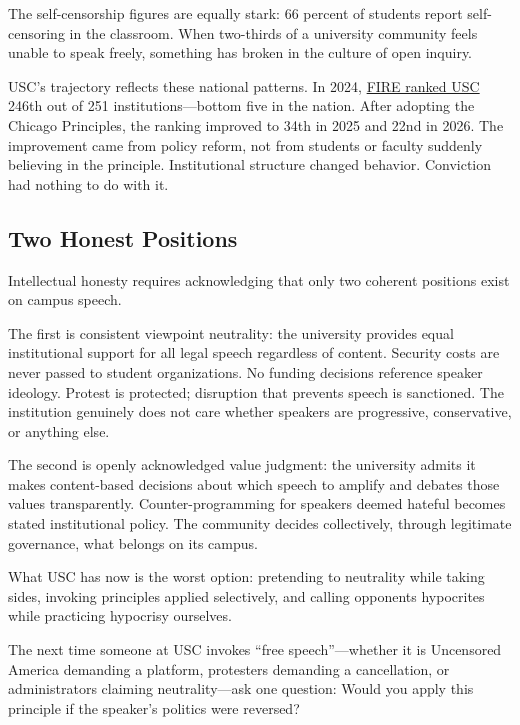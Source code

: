 \documentclass[11pt]{article}
\begin{document}
The self-censorship figures are equally stark: 66 percent of students report self-censoring in the classroom. When two-thirds of a university community feels unable to speak freely, something has broken in the culture of open inquiry.

USC's trajectory reflects these national patterns. In 2024, \href{https://thefire.org/sites/default/files/2024-09/2025\%20CFSR\%20Spotlight\%20-\%20U\%20of\%20South\%20Carolina.pdf}{FIRE ranked USC} 246th out of 251 institutions---bottom five in the nation. After adopting the Chicago Principles, the ranking improved to 34th in 2025 and 22nd in 2026. The improvement came from policy reform, not from students or faculty suddenly believing in the principle. Institutional structure changed behavior. Conviction had nothing to do with it.

\subsection{Two Honest Positions}

Intellectual honesty requires acknowledging that only two coherent positions exist on campus speech.

The first is consistent viewpoint neutrality: the university provides equal institutional support for all legal speech regardless of content. Security costs are never passed to student organizations. No funding decisions reference speaker ideology. Protest is protected; disruption that prevents speech is sanctioned. The institution genuinely does not care whether speakers are progressive, conservative, or anything else.

The second is openly acknowledged value judgment: the university admits it makes content-based decisions about which speech to amplify and debates those values transparently. Counter-programming for speakers deemed hateful becomes stated institutional policy. The community decides collectively, through legitimate governance, what belongs on its campus.

What USC has now is the worst option: pretending to neutrality while taking sides, invoking principles applied selectively, and calling opponents hypocrites while practicing hypocrisy ourselves.

The next time someone at USC invokes ``free speech''---whether it is Uncensored America demanding a platform, protesters demanding a cancellation, or administrators claiming neutrality---ask one question: Would you apply this principle if the speaker's politics were reversed?
\end{document}
